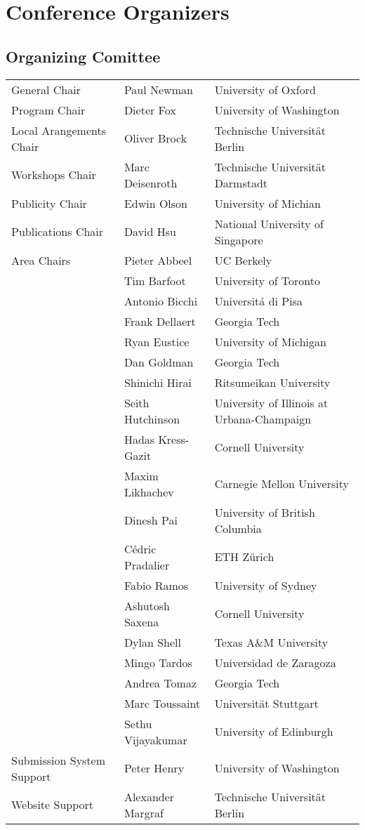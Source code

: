 \chapter{Conference Organizers}

\section{Organizing Comittee}

\begin{tabular}{>{\raggedleft}p{5cm}p{4.5cm}>{\small}p{7cm}}
General Chair & Paul Newman & University of Oxford\\
Program Chair & Dieter Fox & University of Washington\\
Local Arangements Chair & Oliver Brock & Technische Universit\"at Berlin\\
Workshops Chair & Marc Deisenroth & Technische Universit\"at Darmstadt\\
Publicity Chair & Edwin Olson & University of Michian\\
Publications Chair & David Hsu & National University of Singapore\\[5mm]
Area Chairs & Pieter Abbeel & UC Berkely\\
&Tim Barfoot& University of Toronto \\
&Antonio Bicchi & Universit\'a di Pisa\\
&Frank Dellaert & Georgia Tech\\
&Ryan Eustice & University of Michigan\\
&Dan Goldman& Georgia Tech\\
&Shinichi Hirai & Ritsumeikan University\\
& Seith Hutchinson& University of Illinois at Urbana-Champaign\\
& Hadas Kress-Gazit& Cornell University\\
& Maxim Likhachev& Carnegie Mellon University\\
& Dinesh Pai& University of British Columbia\\
& C\'edric Pradalier& ETH Z\"urich\\
& Fabio Ramos& University of Sydney\\
& Ashutosh Saxena& Cornell University\\
& Dylan Shell& Texas A\&M University\\
& Mingo Tardos& Universidad de Zaragoza\\
& Andrea Tomaz& Georgia Tech\\
& Marc Toussaint& Universit\"at Stuttgart\\
& Sethu Vijayakumar& University of Edinburgh\\[5mm]

Submission System Support & Peter Henry & University of Washington\\
Website Support &Alexander Margraf& Technische Universit\"at Berlin\\
\end{tabular}


